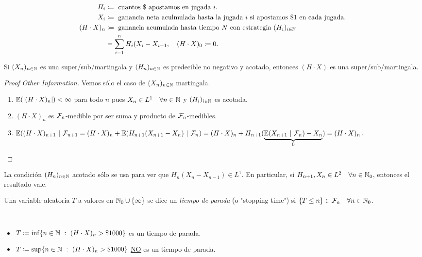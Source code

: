 
\begin{align*}
	H_{i} &\coloneq \text{ cuantos \$ apostamos en jugada $i$.} \\
	X_{i} &\coloneq \text{ ganancia neta aculmulada hasta la jugada $i$ si apostamos \$1 en cada jugada.} \\
	(H \cdot X)_{n} &\coloneq \text{ ganancia acumulada hasta tiempo $N$ con estrategia } (H_{i})_{i \in \mathbb{N}} \\
	&= \sum_{i=1}^{n} H_{i} (X_{i} - X_{i-1}, \quad (H \cdot X)_{0} \coloneq 0.
\end{align*}

\begin{theorem}
	Si $(X_{n})_{n \in \mathbb{N}}$ es una super/sub/martingala y $(H_{n})_{n \in \mathbb{N}}$ es predecible no negativo y acotado, entonces $(H \cdot X)$ es una super/sub/martingala.
\end{theorem}
\begin{proof}[Proof Other Information]
	Vemos sólo el caso de $(X_{n})_{n \in \mathbb{N}}$ martingala.
	\begin{enumerate}
		\item $\mathbb{E}(|(H \cdot X)_{n}|) < \infty$ para todo $n$ pues $X_{n} \in L^{1} \quad \forall n \in \mathbb{N}$ y $(H_{i})_{i \in \mathbb{N}}$ es acotada.

		\item $(H \cdot X)_{n}$ es $\mathcal{F}_{n}$-medible por ser suma y producto de $\mathcal{F}_{n}$-medibles.

		\item $\mbb{E}((H \cdot X)_{n+1} \ | \ \mcal{F}_{n+1} = (H \cdot X)_{n} + \mbb{E}(H_{n+1}(X_{n+1} - X_{n}) \ | \ \mcal{F}_{n}) = (H \cdot X)_{n} + H_{n+1}(\underbrace{\mbb{E}(X_{n+1} \ | \ \mcal{F}_{n}) - X_{n}}_{0}) = (H \cdot X)_{n}$. \qedhere
	\end{enumerate}
\end{proof}

\begin{remark}
	La condición $(H_{n})_{n \in \mathbb{N}}$ acotado sólo se usa para ver que $H_{n}(X_{n} - X_{n - 1}) \in L^{1}$. En particular, si $H_{n+1}, X_{n} \in L^{2} \quad \forall n \in \mathbb{N}_{0}$, entonces el resultado vale.
\end{remark}

\begin{definition}
	Una variable aleatoria $T$ a valores en $\mathbb{N}_{0} \cup \{\infty\}$ se dice un \textit{tiempo de parada} (o "stopping time") si $\{T \leq n\} \in \mathcal{F}_{n} \quad \forall n \in \mathbb{N}_{0}$.  
\end{definition}
\medskip
\begin{eg}~
	\begin{itemize}
		\item $T \coloneq \inf \{n \in \mathbb{N} \ : \ (H \cdot X)_{n} > \$ 1000\}$ es un tiempo de parada.

		\item $T \coloneq \sup \{n \in \mathbb{N}  \ : \ (H \cdot X)_{n} > \$ 1000\}$ \underline{NO} es un tiempo de parada. 
	\end{itemize}
\end{eg}

